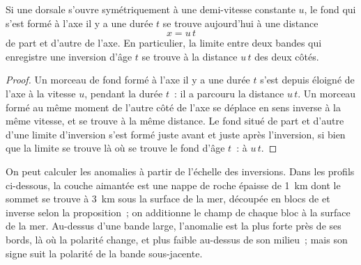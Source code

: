 \begin{proposition}\label{prop:g11:drift-to-spreading:stripe}
Si une dorsale s'ouvre symétriquement à une demi-vitesse constante $u$, le
fond qui s'est formé à l'axe il y a une durée $t$ se trouve aujourd'hui à
une distance
\[
  x = u\,t
\]
de part et d'autre de l'axe. En particulier, la limite entre deux bandes
qui enregistre une inversion d'âge $t$ se trouve à la distance $u\,t$ des
deux côtés.
\end{proposition}

\begin{proof}
Un morceau de fond formé à l'axe il y a une durée $t$ s'est depuis éloigné
de l'axe à la vitesse $u$, pendant la durée $t$~: il a parcouru la distance
$u\,t$. Un morceau formé au même moment de l'autre côté de l'axe se déplace
en sens inverse à la même vitesse, et se trouve à la même distance. Le fond
situé de part et d'autre d'une limite d'inversion s'est formé juste avant
et juste après l'inversion, si bien que la limite se trouve là où se trouve
le fond d'âge $t$~: à $u\,t$.
\end{proof}

On peut calculer les anomalies à partir de l'échelle des inversions. Dans
les profils ci-dessous, la couche aimantée est une nappe de roche épaisse
de \qty{1}{km} dont le sommet se trouve à \qty{3}{km} sous la surface de la
mer, découpée en blocs de  et inverse selon la
proposition~; on additionne le champ de chaque bloc à la surface de la mer.
Au-dessus d'une bande large, l'anomalie est la plus forte près de ses
bords, là où la polarité change, et plus faible au-dessus de son milieu~;
mais son signe suit la polarité de la bande sous-jacente.

